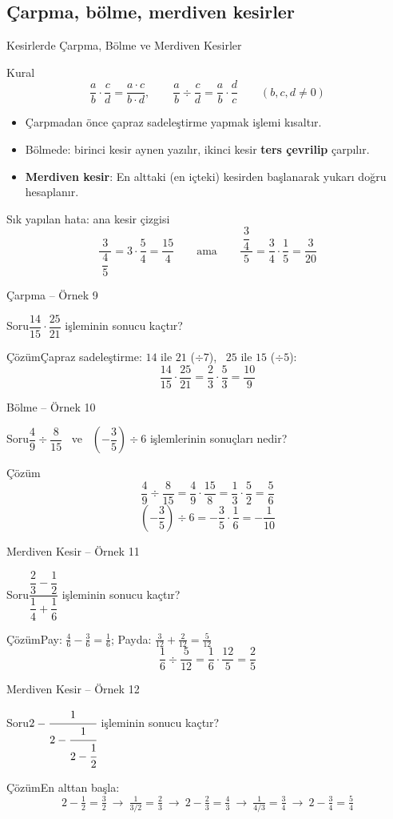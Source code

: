\documentclass[aspectratio=169,11pt]{beamer}
\newcommand{\soru}[3]{%
\begin{frame}{#1}
  \begin{block}{Soru}\large #2\end{block}
  \pause
  \begin{exampleblock}{Çözüm}\large #3\end{exampleblock}
\end{frame}}
\begin{document}
\subsection{Çarpma, bölme, merdiven kesirler}
\begin{frame}{Kesirlerde Çarpma, Bölme ve Merdiven Kesirler}
\begin{block}{Kural}
\[\frac{a}{b}\cdot\frac{c}{d}=\frac{a\cdot c}{b\cdot d},\qquad \frac{a}{b}\div\frac{c}{d}=\frac{a}{b}\cdot\frac{d}{c}\qquad(b,c,d\neq 0)\]
\vspace{-6pt}
\begin{itemize}
\item Çarpmadan önce çapraz sadeleştirme yapmak işlemi kısaltır.
\item Bölmede: birinci kesir aynen yazılır, ikinci kesir \textbf{ters çevrilip} çarpılır.
\item \textbf{Merdiven kesir}: En alttaki (en içteki) kesirden başlanarak yukarı doğru hesaplanır.
\end{itemize}
\end{block}
\begin{alertblock}{Sık yapılan hata: ana kesir çizgisi}
\[\frac{3}{\ \dfrac{4}{5}\ }=3\cdot\frac{5}{4}=\frac{15}{4}\qquad\text{ama}\qquad \frac{\ \dfrac{3}{4}\ }{5}=\frac{3}{4}\cdot\frac{1}{5}=\frac{3}{20}\]
\end{alertblock}
\end{frame}

\soru{Çarpma -- Örnek 9}
{\(\dfrac{14}{15}\cdot\dfrac{25}{21}\) işleminin sonucu kaçtır?}
{Çapraz sadeleştirme: \(14\) ile \(21\) (\(\div 7\)), \ \(25\) ile \(15\) (\(\div 5\)):
\[\frac{14}{15}\cdot\frac{25}{21}=\frac{2}{3}\cdot\frac{5}{3}=\frac{10}{9}\]}

\soru{Bölme -- Örnek 10}
{\(\dfrac{4}{9}\div\dfrac{8}{15}\) \ ve \ \(\left(-\dfrac{3}{5}\right)\div 6\) işlemlerinin sonuçları nedir?}
{\[\frac{4}{9}\div\frac{8}{15}=\frac{4}{9}\cdot\frac{15}{8}=\frac{1}{3}\cdot\frac{5}{2}=\frac{5}{6}\]
\[\left(-\frac{3}{5}\right)\div 6=-\frac{3}{5}\cdot\frac{1}{6}=-\frac{1}{10}\]}

\soru{Merdiven Kesir -- Örnek 11}
{\(\dfrac{\dfrac{2}{3}-\dfrac{1}{2}}{\dfrac{1}{4}+\dfrac{1}{6}}\) işleminin sonucu kaçtır?}
{Pay: \(\frac{4}{6}-\frac{3}{6}=\frac{1}{6}\); \quad Payda: \(\frac{3}{12}+\frac{2}{12}=\frac{5}{12}\)
\[\frac{1}{6}\div\frac{5}{12}=\frac{1}{6}\cdot\frac{12}{5}=\frac{2}{5}\]}

\soru{Merdiven Kesir -- Örnek 12}
{\(2-\cfrac{1}{2-\cfrac{1}{2-\cfrac{1}{2}}}\) işleminin sonucu kaçtır?}
{En alttan başla:
\[2-\tfrac{1}{2}=\tfrac{3}{2}\ \rightarrow\ \tfrac{1}{3/2}=\tfrac{2}{3}\ \rightarrow\ 2-\tfrac{2}{3}=\tfrac{4}{3}\ \rightarrow\ \tfrac{1}{4/3}=\tfrac{3}{4}\ \rightarrow\ 2-\tfrac{3}{4}=\tfrac{5}{4}\]}
\end{document}
